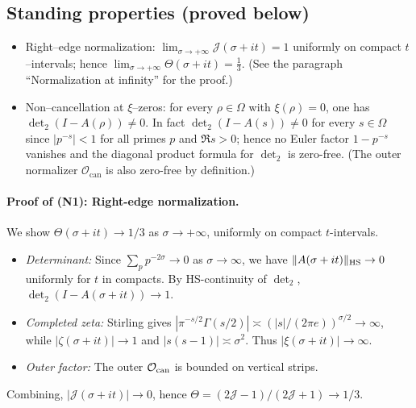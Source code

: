 \documentclass[11pt]{article}
\theoremstyle{definition}
\theoremstyle{remark}
\theoremstyle{definition}
\begin{document}
\subsection*{Standing properties (proved below)}\label{sec:standing-assumptions}
\begin{itemize}
\item[(N1)] Right--edge normalization: $\displaystyle \lim_{\sigma\to+\infty}\mathcal J(\sigma+it)=1$ uniformly on compact $t$--intervals; hence $\lim_{\sigma\to+\infty}\Theta(\sigma+it)=\tfrac13$. (See the paragraph ``Normalization at infinity'' for the proof.)
\item[(N2)] Non--cancellation at $\xi$--zeros: for every $\rho\in\Omega$ with $\xi(\rho)=0$, one has $\det_2(I-A(\rho))\ne 0$.
In fact $\det_2(I-A(s))\neq 0$ for every $s\in\Omega$ since $|p^{-s}|<1$ for all primes $p$ and $\Re s>0$; hence no Euler factor $1-p^{-s}$ vanishes and the diagonal product formula for $\det_2$ is zero-free. (The outer normalizer $\mathcal O_{\mathrm{can}}$ is also zero-free by definition.)
\end{itemize}

\paragraph{Proof of (N1): Right-edge normalization.}
We show $\Theta(\sigma+it) \to 1/3$ as $\sigma \to +\infty$, uniformly on compact $t$-intervals.
\begin{itemize}
\item \emph{Determinant:} Since $\sum_p p^{-2\sigma} \to 0$ as $\sigma \to \infty$, we have $\|A(\sigma+it)\|_{\rm HS} \to 0$ uniformly for $t$ in compacts. By HS-continuity of $\det_2$, $\det_2(I-A(\sigma+it)) \to 1$.
\item \emph{Completed zeta:} Stirling gives $|\pi^{-s/2}\Gamma(s/2)| \asymp (|s|/(2\pi e))^{\sigma/2} \to \infty$, while $|\zeta(\sigma+it)| \to 1$ and $|s(s-1)| \asymp \sigma^2$. Thus $|\xi(\sigma+it)| \to \infty$.
\item \emph{Outer factor:} The outer $\mathcal{O}_{\rm can}$ is bounded on vertical strips.
\end{itemize}
Combining, $|\mathcal{J}(\sigma+it)| \to 0$, hence $\Theta = (2\mathcal{J}-1)/(2\mathcal{J}+1) \to 1/3$.
\end{document}
